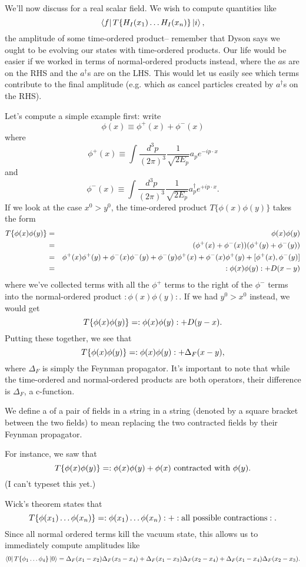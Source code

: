 We'll now discuss  for a real scalar field. We wish to compute quantities like
$$\left< f \right|T\{H_I(x_1)\ldots H_I(x_n)\}\left| i \right>,$$
the amplitude of some time-ordered product-- remember that Dyson says we ought to be evolving our states with time-ordered products. Our life would be easier if we worked in terms of normal-ordered products instead, where the $a$s are on the RHS and the $a^\dagger$s are on the LHS. This would let us easily see which terms contribute to the final amplitude (e.g. which $a$s cancel particles created by $a^\dagger$s on the RHS).

Let's compute a simple example first: write
$$\phi(x)\equiv \phi^+(x)+\phi^-(x)$$
where
$$\phi^+ (x)\equiv \int \frac{d^3p}{(2\pi)^3}\frac{1}{\sqrt{2E_p}} a_p e^{-ip\cdot x}$$
and
$$\phi^-(x)\equiv \int \frac{d^3p}{(2\pi)^3}\frac{1}{\sqrt{2E_p}} a_p^\dagger e^{+ip\cdot x}.$$
If we look at the case $x^0>y^0$, the time-ordered product $T\{\phi(x)\phi(y)\}$ takes the form
\begin{eqnarray*}
T\{\phi(x)\phi(y)\}&=&\phi(x)\phi(y)\\
&=&(\phi^+(x)+\phi^-(x))(\phi^+(y)+\phi^-(y))\\
&=&\phi^+(x)\phi^+(y)+\phi^-(x)\phi^-(y)+\phi^-(y)\phi^+(x)+\phi^-(x)\phi^+(y)+[\phi^+(x),\phi^-(y)]\\
&=&:\phi(x)\phi(y):+D(x-y)
\end{eqnarray*}
where we've collected terms with all the $\phi^+$ terms to the right of the $\phi^-$ terms into the normal-ordered product $:\phi(x)\phi(y):$. If we had $y^0>x^0$ instead, we would get
$$T\{\phi(x)\phi(y)\}=:\phi(x)\phi(y):+D(y-x).$$
Putting these together, we see that
$$T\{\phi(x)\phi(y)\}=:\phi(x)\phi(y):+\Delta_F(x-y),$$
where $\Delta_F$ is simply the Feynman propagator. It's important to note that while the time-ordered and normal-ordered products are both operators, their difference is $\Delta_F$, a c-function.

\begin{defn}
We define a  of a pair of fields in a string in a string (denoted by a square bracket between the two fields) to mean replacing the two contracted fields by their Feynman propagator.

For instance, we saw that
$$T\{\phi(x)\phi(y)\}=:\phi(x)\phi(y)+\phi(x)\text{ contracted with }\phi(y).$$
(I can't typeset this yet.)
\end{defn}

Wick's theorem states that
$$T\{\phi(x_1)\ldots \phi(x_n)\}=:\phi(x_1)\ldots \phi(x_n):+:\text{all possible contractions}:.$$
Since all normal ordered terms kill the vacuum state, this allows us to immediately compute amplitudes like
$$\left< 0 \right|T\{\phi_1\ldots \phi_4\}\left| 0 \right>=\Delta_F (x_1-x_2)\Delta_F(x_3-x_4)+\Delta_F(x_1-x_3)\Delta_F(x_2-x_4)+\Delta_F(x_1-x_4)\Delta_F(x_2-x_3).$$


